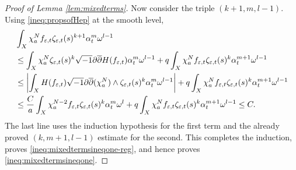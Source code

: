 \documentclass[11pt]{amsart}
\numberwithin{equation}{section}
\newcommand{\vep}{\varepsilon}
\renewcommand{\d}{\partial}
\newcommand{\ddbar}{\sqrt{-1}\d\overline{\d}}
\theoremstyle{plain}
\theoremstyle{remark}
\begin{document}
\begin{proof}[Proof of Lemma \ref{lem:mixedterms}]
Now consider the triple $(k+1,m,l-1)$.  Using \eqref{ineq:propsofHep} at the smooth level,
\begin{align}
&\int_X\chi_a^N f_{\vep,t}\zeta_{\vep,t}(s)^{k+1}\alpha_t^m\omega^{l-1}      \notag\\
&\leq
\int_X\chi_a^N\zeta_{\vep,t}(s)^k\ddbar H(f_{\vep,t})\alpha_t^m\omega^{l-1}
+q\int_X\chi_a^N f_{\vep,t}\zeta_{\vep,t}(s)^k\alpha_t^{m+1}\omega^{l-1}      \notag\\
&\leq\left|\int_X H(f_{\vep,t})\ddbar(\chi_a^N)\wedge\zeta_{\vep,t}(s)^k\alpha_t^m\omega^{l-1}\right|
+q\int_X\chi_a^N f_{\vep,t}\zeta_{\vep,t}(s)^k\alpha_t^{m+1}\omega^{l-1}      \notag\\
&\leq
\frac{C}{a}\int_X\chi_a^{N-2}f_{\vep,t}\zeta_{\vep,t}(s)^k\alpha_t^m\omega^l
+q\int_X\chi_a^N f_{\vep,t}\zeta_{\vep,t}(s)^k\alpha_t^{m+1}\omega^{l-1}
\leq C.\label{ineq:regularized-kplusone}
\end{align}
The last line uses the induction hypothesis for the first term and the already proved $(k,m+1,l-1)$ estimate for the second.  This completes the induction, proves \eqref{ineq:mixedtermsineqone-reg}, and hence proves \eqref{ineq:mixedtermsineqone}.
\end{proof}
\end{document}
